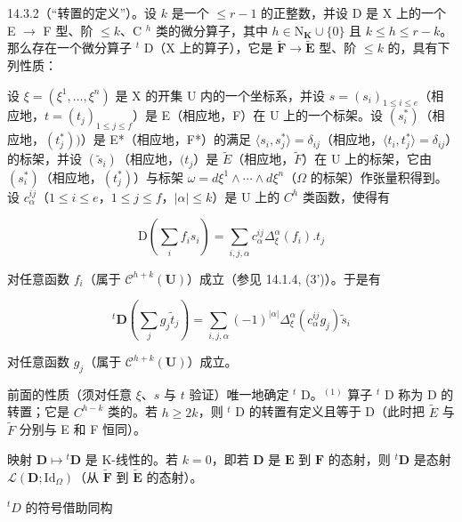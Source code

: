 14.3.2（“转置的定义”）。设 \(k\) 是一个 \(\leqslant r - 1\) 的正整数，并设 D 是 X 上的一个 E \(\rightarrow\) F 型、阶 \(\leqslant k\)、C \(^{h}\) 类的微分算子，其中 \(h \in \mathrm{N}_{\mathbf{K}} \cup \{0\}\) 且 \(k \leqslant h \leqslant r - k\)。那么存在一个微分算子 \(^{t}\) D（X 上的算子），它是 \(\widetilde{\mathbf{F}} \to \widetilde{\mathbf{E}}\) 型、阶 \(\leqslant k\) 的，具有下列性质：

设 \(\xi = (\xi^1, \ldots, \xi^n)\) 是 X 的开集 U 内的一个坐标系，并设 \(s = (s_i)_{1 \leqslant i \leqslant e}\)（相应地，\(t = (t_j)_{1 \leqslant j \leqslant f}\)）是 E（相应地，F）在 U 上的一个标架。设 \((s_i^*)\)（相应地，\((t_j^*))\)）是 E*（相应地，F*）的满足 \(\langle s_i, s_j^* \rangle = \delta_{ij}\)（相应地，\(\langle t_i, t_j^* \rangle = \delta_{ij}\)）的标架，并设 \((\tilde{s}_i)\)（相应地，\((t_j\)）是 \(\tilde{E}\)（相应地，\(\tilde{F}\)）在 U 上的标架，它由 \((s_i^*)\)（相应地，\((t_j^*)\)）与标架 \(\omega = d\xi^1 \wedge \cdots \wedge d\xi^n\)（\(\Omega\) 的标架）作张量积得到。设 \(c_\alpha^{ij}\)（\(1 \leqslant i \leqslant e\)，\(1 \leqslant j \leqslant f\)，\(|\alpha| \leqslant k\)）是 U 上的 \(C^h\) 类函数，使得有

\[
\mathrm{D} \left(\sum_ {i} f _ {i} s _ {i}\right) = \sum_ {i, j, \alpha} c _ {\alpha} ^ {i j} \Delta_ {\xi} ^ {\alpha} (f _ {i}). t _ {j}
\]

对任意函数 \(f_{i}\)（属于 \(\mathcal{C}^{h+k}(\mathbf{U})\)）成立（参见 14.1.4, (3')）。于是有

\[
{ } ^ { t } \mathbf { D } \left( \sum _ { j } g _ { j } \tilde { t } _ { j } \right) = \sum _ { i , j , \alpha } ( - 1 ) ^ { | \alpha | } \Delta _ { \xi } ^ { \alpha } ( c _ { \alpha } ^ { i j } g _ { j } ) \tilde { s } _ { i }
\]

对任意函数 \(g_{j}\)（属于 \(\mathcal{C}^{h+k}(\mathbf{U})\)）成立。

前面的性质（须对任意 \(\xi\)、\(s\) 与 \(t\) 验证）唯一地确定 \(^{t}\) D。\(^{(1)}\) 算子 \(^{t}\) D 称为 D 的转置；它是 \(C^{h-k}\) 类的。若 \(h \geqslant 2k\)，则 \(^{t}\) D 的转置有定义且等于 D（此时把 \(\tilde{E}\) 与 \(\tilde{F}\) 分别与 E 和 F 恒同）。

映射 \(\mathbf{D} \mapsto {}^t\mathbf{D}\) 是 K-线性的。若 \(k = 0\)，即若 \(\mathbf{D}\) 是 \(\mathbf{E}\) 到 \(\mathbf{F}\) 的态射，则 \({}^t\mathbf{D}\) 是态射 \(\mathcal{L}(\mathbf{D}; \mathrm{Id}_{\Omega})\)（从 \(\tilde{\mathbf{F}}\) 到 \(\tilde{\mathbf{E}}\) 的态射）。

\({}^{t}D\) 的符号借助同构

